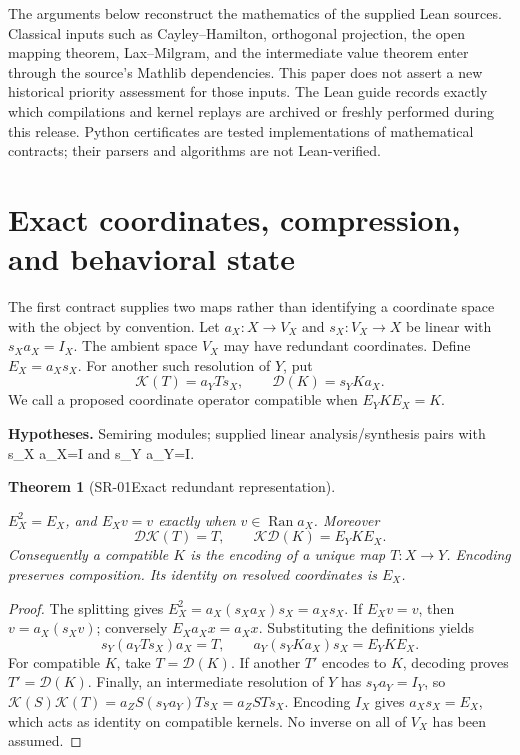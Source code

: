 \documentclass[11pt]{article}
\newtheorem{theorem}{Theorem}[section]
\theoremstyle{definition}\newtheorem{definition}[theorem]{Definition}
\theoremstyle{remark}\newtheorem{remark}[theorem]{Remark}
\DeclareMathOperator{\Ran}{Ran}\DeclareMathOperator{\dist}{dist}
\begin{document}
The arguments below reconstruct the mathematics of the supplied Lean sources.
Classical inputs such as Cayley--Hamilton, orthogonal projection, the open
mapping theorem, Lax--Milgram, and the intermediate value theorem enter through
the source's Mathlib dependencies. This paper does not assert a new historical
priority assessment for those inputs. The Lean guide records exactly which
compilations and kernel replays are archived or freshly performed during this
release. Python certificates are tested implementations of mathematical
contracts; their parsers and algorithms are not Lean-verified.


\section{Exact coordinates, compression, and behavioral state}

The first contract supplies two maps rather than identifying a coordinate
space with the object by convention. Let $a_X:X\to V_X$ and $s_X:V_X\to X$
be linear with $s_Xa_X=I_X$. The ambient space $V_X$ may have redundant
coordinates. Define $E_X=a_Xs_X$. For another such resolution of $Y$, put
\[
\mathcal K(T)=a_YTs_X,\qquad \mathcal D(K)=s_YKa_X.
\]
We call a proposed coordinate operator compatible when $E_YKE_X=K$.


\par{\small\textbf{Hypotheses.} Semiring modules; supplied linear analysis/\allowbreak synthesis pairs with s\_X a\_X=I and s\_Y a\_Y=I.}\par

\begin{theorem}[SR-01\quad Exact redundant representation]\label{SR-01}

$E_X^2=E_X$, and $E_Xv=v$ exactly when $v\in\Ran a_X$. Moreover
\[
\mathcal D\mathcal K(T)=T,\qquad
\mathcal K\mathcal D(K)=E_YKE_X.
\]
Consequently a compatible $K$ is the encoding of a unique map $T:X\to Y$.
Encoding preserves composition. Its identity on resolved coordinates is $E_X$.

\end{theorem}
\begin{proof}

The splitting gives $E_X^2=a_X(s_Xa_X)s_X=a_Xs_X$. If $E_Xv=v$, then
$v=a_X(s_Xv)$; conversely $E_Xa_Xx=a_Xx$. Substituting the definitions yields
\[
s_Y(a_YTs_X)a_X=T,\qquad
a_Y(s_YKa_X)s_X=E_YKE_X.
\]
For compatible $K$, take $T=\mathcal D(K)$. If another $T'$ encodes to $K$,
decoding proves $T'=\mathcal D(K)$. Finally, an intermediate resolution of $Y$
has $s_Ya_Y=I_Y$, so
$\mathcal K(S)\mathcal K(T)=a_ZS(s_Ya_Y)Ts_X=a_ZSTs_X$.
Encoding $I_X$ gives $a_Xs_X=E_X$, which acts as identity on compatible kernels.
No inverse on all of $V_X$ has been assumed.

\end{proof}
\end{document}
